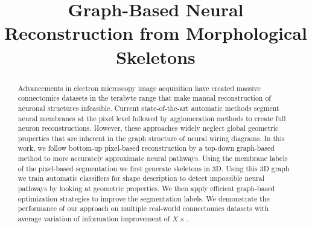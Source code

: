 \documentclass[10pt,twocolumn,letterpaper]{article}
\begin{document}
\title{Graph-Based Neural Reconstruction from Morphological Skeletons}



\maketitle
%

\begin{abstract}
Advancements in electron microscopy image acquisition have created massive connectomics datasets in the terabyte range that make manual reconstruction of neuronal structures infeasible. 
Current state-of-the-art automatic methods segment neural membranes at the pixel level followed by agglomeration methods to create full neuron reconstructions. 
However, these approaches widely neglect global geometric properties that are inherent in the graph structure of neural wiring diagrams.
In this work, we follow bottom-up pixel-based reconstruction by a top-down graph-based method to more accurately approximate neural pathways. 
Using the membrane labels of the pixel-based segmentation we first generate skeletons in 3D.
Using this 3D graph we train automatic classifiers for shape description to detect impossible neural pathways by looking at geometric properties.
We then apply efficient graph-based optimization strategies to improve the segmentation labels. We demonstrate the performance of our approach on multiple real-world connectomics datasets with average variation of information improvement of $X\times$. 
\end{abstract}














{\small

}
\end{document}
